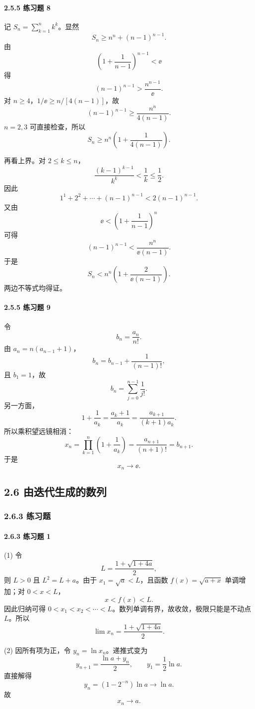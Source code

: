 \paragraph{2.5.5 练习题 8}
\begin{xsolution}
记 $S_n=\sum_{k=1}^n k^k$。显然
\[
  S_n\ge n^n+(n-1)^{n-1}.
\]
由
\[
  \left(1+\frac1{n-1}\right)^{n-1}<\ee
\]
得
\[
  (n-1)^{n-1}>\frac{n^{n-1}}\ee.
\]
对 $n\ge4$，$1/\ee\ge n/[4(n-1)]$，故
\[
  (n-1)^{n-1}\ge\frac{n^n}{4(n-1)}.
\]
$n=2,3$ 可直接检查，所以
\[
  S_n\ge n^n\left(1+\frac1{4(n-1)}\right).
\]

再看上界。对 $2\le k\le n$，
\[
  \frac{(k-1)^{k-1}}{k^k}<\frac1k\le\frac12.
\]
因此
\[
  1^1+2^2+\cdots+(n-1)^{n-1}<2(n-1)^{n-1}.
\]
又由
\[
  \ee<\left(1+\frac1{n-1}\right)^n
\]
可得
\[
  (n-1)^{n-1}<\frac{n^n}{\ee(n-1)}.
\]
于是
\[
  S_n<n^n\left(1+\frac2{\ee(n-1)}\right).
\]
两边不等式均得证。
\end{xsolution}

\paragraph{2.5.5 练习题 9}
\begin{xsolution}
令
\[
  b_n=\frac{a_n}{n!}.
\]
由 $a_n=n(a_{n-1}+1)$，
\[
  b_n=b_{n-1}+\frac1{(n-1)!},
\]
且 $b_1=1$，故
\[
  b_n=\sum_{j=0}^{n-1}\frac1{j!}.
\]
另一方面，
\[
  1+\frac1{a_k}
  =\frac{a_k+1}{a_k}
  =\frac{a_{k+1}}{(k+1)a_k}.
\]
所以乘积望远镜相消：
\[
  x_n=\prod_{k=1}^n\left(1+\frac1{a_k}\right)
  =\frac{a_{n+1}}{(n+1)!}=b_{n+1}.
\]
于是
\[
  \boxed{x_n\to\ee}.
\]
\end{xsolution}

\subsection*{2.6 由迭代生成的数列}

\subsubsection*{2.6.3 练习题}

\paragraph{2.6.3 练习题 1}
\begin{xsolution}
(1) 令
\[
  L=\frac{1+\sqrt{1+4a}}2,
\]
则 $L>0$ 且 $L^2=L+a$。由于 $x_1=\sqrt a<L$，且函数 $f(x)=\sqrt{a+x}$ 单调增加；对 $0<x<L$，
\[
  x<f(x)<L.
\]
因此归纳可得 $0<x_1<x_2<\cdots<L$。数列单调有界，故收敛，极限只能是不动点 $L$。所以
\[
  \boxed{\lim x_n=\frac{1+\sqrt{1+4a}}2}.
\]

(2) 因所有项为正，令 $y_n=\ln x_n$。递推式变为
\[
  y_{n+1}=\frac{\ln a+y_n}{2},
  \qquad y_1=\frac12\ln a.
\]
直接解得
\[
  y_n=(1-2^{-n})\ln a\to\ln a.
\]
故
\[
  \boxed{x_n\to a}.
\]
\end{xsolution}

